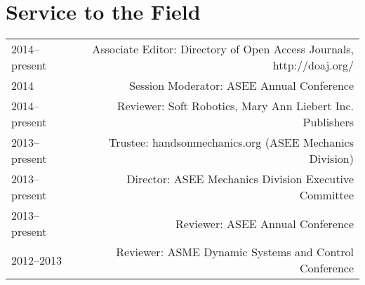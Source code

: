 \section*{Service to the Field}
\begin{tabular}{L!{\VRule}R}
2014--present&Associate Editor: Directory of Open Access Journals, http://doaj.org/\\
2014&Session Moderator: ASEE Annual Conference\\
2014--present&Reviewer: Soft Robotics, Mary Ann Liebert Inc. Publishers\\
2013--present&Trustee: handsonmechanics.org (ASEE Mechanics Division)\\
2013--present&Director: ASEE Mechanics Division Executive Committee\\
2013--present&Reviewer: ASEE Annual Conference\\
2012--2013&Reviewer: ASME Dynamic Systems and Control Conference\\
\end{tabular}